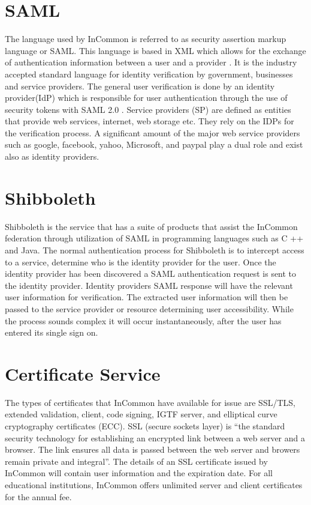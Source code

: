 \documentclass[9pt,twocolumn,twoside]{../../styles/osajnl}
\begin{document}
\section{SAML}

The language used by InCommon is referred to as security assertion
markup language or SAML.  This language is based in XML which allows
for the exchange of authentication information between a user and a
provider \cite{www-wiki}.  It is the industry accepted standard
language for identity verification by government, businesses and
service providers.  The general user verification is done by an
identity provider(IdP) which is responsible for user authentication
through the use of security tokens with SAML 2.0
\cite{www-empower}. Service providers (SP) are defined as entities
that provide web services, internet, web storage etc.  They rely on
the IDPs for the verification process.  A significant amount of the
major web service providers such as google, facebook, yahoo,
Microsoft, and paypal play a dual role and exist also as identity
providers.

\section{Shibboleth}

Shibboleth is the service that has a suite of products that assist the
InCommon federation through utilization of SAML in programming
languages such as C ++ and Java\cite{www-shibboleth}.  The normal
authentication process for Shibboleth is to intercept access to a
service, determine who is the identity provider for the user.  Once
the identity provider has been discovered a SAML authentication
request is sent to the identity provider.  Identity providers SAML
response will have the relevant user information for verification.
The extracted user information will then be passed to the service
provider or resource determining user accessibility.  While the
process sounds complex it will occur instantaneously, after the user
has entered its single sign on.


\section{Certificate Service}

The types of certificates that InCommon have available for issue are
SSL/TLS, extended validation, client, code signing, IGTF server, and
elliptical curve cryptography certificates (ECC).  SSL (secure sockets
layer) is “the standard security technology for establishing an
encrypted link between a web server and a browser.  The link ensures
all data is passed between the web server and browers remain private
and integral”\cite{www-ssl}.  The details of an SSL certificate
issued by InCommon will contain user information and the
expiration date. For all educational institutions, InCommon offers
unlimited server and client certificates for the annual fee.
\end{document}
